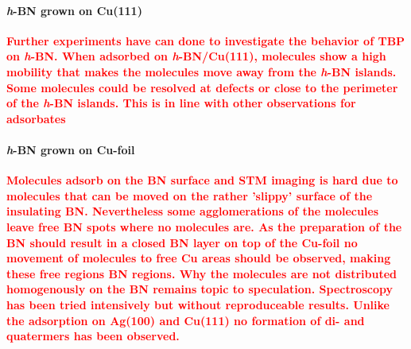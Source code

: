 \paragraph{\textit{h}-BN grown on Cu(111)}
\textcolor{red}{\textbf{
Further experiments have can done to investigate the behavior of TBP on \textit{h}-BN. When adsorbed on \textit{h}-BN/Cu(111), molecules show a high mobility that makes the molecules move away from the \textit{h}-BN islands. Some molecules could be resolved at defects or close to the perimeter of the \textit{h}-BN islands. This is in line with other observations for adsorbates
}}

\paragraph{\textit{h}-BN grown on Cu-foil}
\textcolor{red}{\textbf{
Molecules adsorb on the BN surface and STM imaging is hard due to molecules that can be moved on the rather 'slippy' surface of the insulating BN. Nevertheless some agglomerations of the molecules leave free BN spots where no molecules are. As the preparation of the BN should result in a closed BN layer on top of the Cu-foil no movement of molecules to free Cu areas should be observed, making these free regions BN regions.
Why the molecules are not distributed homogenously on the BN remains topic to speculation.
Spectroscopy has been tried intensively but without reproduceable results.
Unlike the adsorption on Ag(100) and Cu(111) no formation of di- and quatermers has been observed.
}}